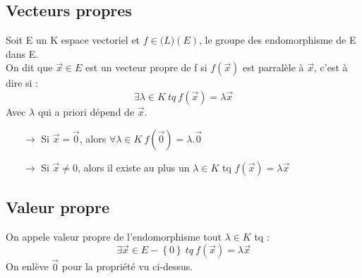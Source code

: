 \subsection{Vecteurs propres}
\begin{de}
Soit E un K espace vectoriel et $f \in \mathcal(L)(E)$, le groupe des endomorphisme de E dans E.\\
On dit que $\overrightarrow{x}\in E$ est un vecteur propre de f si $f(\overrightarrow{x})$ est parralèle à $\overrightarrow{x}$, c'est à dire si :
$$\exists \lambda \in K~ tq~ f(\overrightarrow{x}) = \lambda \overrightarrow{x}$$
Avec $\lambda$ qui a priori dépend de $\overrightarrow{x}$.
\end{de}
\begin{prop}
\begin{itemize}
 \item[$\rightarrow$] Si $\overrightarrow{x} = \overrightarrow{0}$, alors $\forall \lambda \in K~ f(\overrightarrow{0}) = \lambda.\overrightarrow{0}$
 \item[$\rightarrow$] Si $\overrightarrow{x} \neq 0$, alors il existe au plus un $\lambda \in K$ tq $f(\overrightarrow{x}) = \lambda\overrightarrow{x}$
\end{itemize}
\end{prop}
\subsection{Valeur propre}
\begin{de}
On appele valeur propre de l'endomorphisme tout $\lambda \in K$ tq : 
$$\exists \overrightarrow{x}\in E - \left\lbrace 0 \right\rbrace~ tq~ f(\overrightarrow{x}) = \lambda \overrightarrow{x}$$
On enlève $\overrightarrow{0}$ pour la propriété vu ci-dessus.
\end{de}
